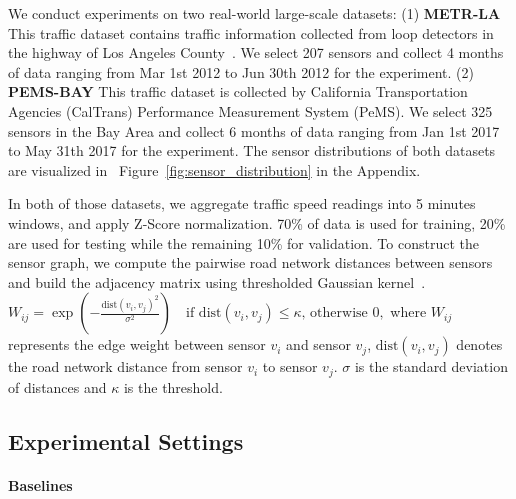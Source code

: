 We conduct experiments on two real-world large-scale datasets: (1) \textbf{METR-LA} This traffic dataset contains traffic information collected from loop detectors in the highway of Los Angeles County~\citep{Jagadish2014}.  We select 207 sensors and collect 4 months of data ranging from Mar 1st 2012 to Jun 30th 2012 for the experiment.
(2) \textbf{PEMS-BAY} This traffic dataset is collected by California Transportation Agencies (CalTrans) Performance Measurement System (PeMS). 
We select 325 sensors in the Bay Area and collect 6 months of data ranging from Jan 1st 2017 to May 31th 2017 for the experiment.
The sensor distributions of both datasets are visualized in~ Figure~\ref{fig:sensor_distribution} in the Appendix. 

In both of those datasets, we aggregate traffic speed readings into 5 minutes windows, and apply Z-Score normalization. 70\% of data is used for training, 20\% are used for testing while the remaining 10\% for validation. 
To construct the sensor graph, we compute the pairwise road network distances between sensors and build the adjacency matrix using thresholded Gaussian kernel~\citep{shuman2013emerging}. 
$
W_{ij} = \exp{\left(-\frac{\mathrm{dist}({v_i, v_j})^2}{\sigma^2}\right)} \quad \text{if } \mathrm{dist}(v_i, v_j) \leq \kappa \text{, otherwise } 0,
$
where $W_{ij}$ represents the edge weight between sensor $v_i$ and sensor $v_j$, $\mathrm{dist}({v_i, v_j})$ denotes the road network distance from sensor $v_i$ to sensor $v_j$. $\sigma$ is the standard deviation of distances and $\kappa$ is the threshold.
\vspace{-0.15in}
\subsection{Experimental Settings}
\vspace{-0.1in}
\paragraph{Baselines}

